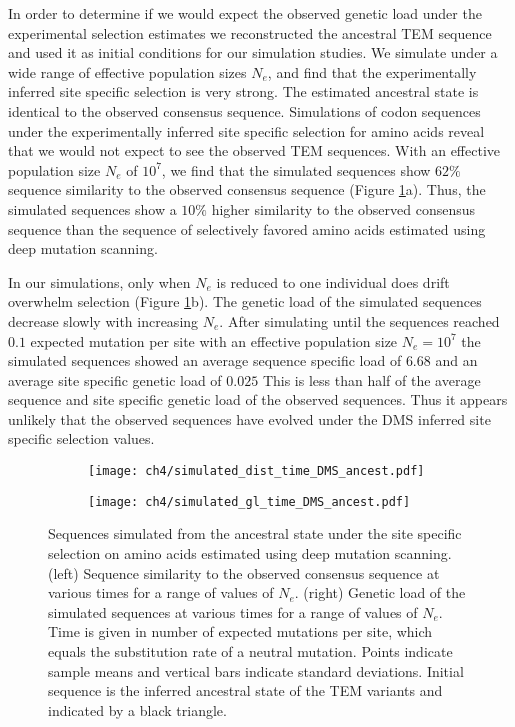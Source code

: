 In order to determine if we would expect the observed genetic load under the experimental selection estimates we reconstructed the ancestral TEM sequence and used it as initial conditions for our simulation studies.
We simulate under a wide range of effective population sizes $N_e$, and find that the experimentally inferred site specific selection is very strong.
The estimated ancestral state is identical to the observed consensus sequence.
Simulations of codon sequences under the experimentally inferred site specific selection for amino acids reveal that we would not expect to see the observed TEM sequences.
With an effective population size $N_e$ of $10^7$, we find that the simulated sequences show $62 \%$ sequence similarity to the observed consensus sequence (Figure \ref{fig:dms_sim}a).
Thus, the simulated sequences show a $10 \%$ higher similarity to the observed consensus sequence than the sequence of selectively favored amino acids estimated using deep mutation scanning.

In our simulations, only when $N_e$ is reduced to one individual does drift overwhelm selection (Figure \ref{fig:dms_sim}b).
The genetic load of the simulated sequences decrease slowly with increasing $N_e$.
After simulating until the sequences reached $0.1$ expected mutation per site with an effective population size $N_e = 10^7$ the simulated sequences showed an average sequence specific load of $6.68$ and an average site specific genetic load of $0.025$
This is less than half of the average sequence and site specific genetic load of the observed sequences.
Thus it appears unlikely that the observed sequences have evolved under the DMS inferred site specific selection values.

\begin{figure}
    \centering
    \begin{subfigure}
        \centering
        \texttt{[image: ch4/simulated\_dist\_time\_DMS\_ancest.pdf]}
    \end{subfigure}
    \begin{subfigure}
        \centering
        \texttt{[image: ch4/simulated\_gl\_time\_DMS\_ancest.pdf]}
    \end{subfigure}
    \caption{Sequences simulated from the ancestral state under the site specific selection on amino acids estimated using deep mutation scanning. 
    (left) Sequence similarity to the observed consensus sequence at various times for a range of values of $N_e$.
    (right) Genetic load of the simulated sequences at various times for a range of values of $N_e$.
    Time is given in number of expected mutations per site, which equals the substitution rate of a neutral mutation.
    Points indicate sample means and vertical bars indicate standard deviations. Initial sequence is the inferred ancestral state of the TEM variants and indicated by a black triangle.}
    \label{fig:dms_sim}
\end{figure}


